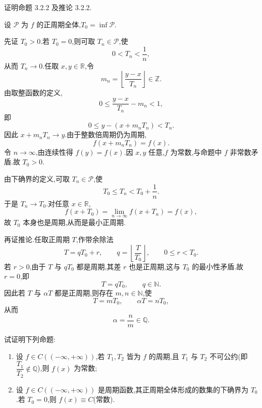\begin{example}
    证明命题 3.2.2 及推论 3.2.2.
\end{example}
\exampleblank

\begin{solution}
    设 $\mathcal P$ 为 $f$ 的正周期全体,$T_0=\inf\mathcal P$.

    先证 $T_0>0$.若 $T_0=0$,则可取 $T_n\in\mathcal P$,使
    \[
        0<T_n<\dfrac{1}{n},
    \]
    从而 $T_n\to0$.任取 $x,y\in\mathbb{R}$,令
    \[
        m_n=\left\lfloor\dfrac{y-x}{T_n}\right\rfloor\in\mathbb{Z}.
    \]
    由取整函数的定义,
    \[
        0\leq\dfrac{y-x}{T_n}-m_n<1,
    \]
    即
    \[
        0\leq y-(x+m_nT_n)<T_n.
    \]
    因此 $x+m_nT_n\to y$.由于整数倍周期仍为周期,
    \[
        f(x+m_nT_n)=f(x).
    \]
    令 $n\to\infty$,由连续性得 $f(y)=f(x)$.因 $x,y$ 任意,$f$ 为常数,与命题中 $f$ 非常数矛盾.故 $T_0>0$.

    由下确界的定义,可取 $T_n\in\mathcal P$,使
    \[
        T_0\leq T_n<T_0+\dfrac{1}{n}.
    \]
    于是 $T_n\to T_0$.对任意 $x\in\mathbb{R}$,
    \[
        f(x+T_0)=\lim\limits_{n\to\infty}f(x+T_n)=f(x),
    \]
    故 $T_0$ 本身也是周期,从而是最小正周期.

    再证推论.任取正周期 $T$,作带余除法
    \[
        T=qT_0+r,\qquad q=\left\lfloor\dfrac{T}{T_0}\right\rfloor,\qquad 0\leq r<T_0.
    \]
    若 $r>0$,由于 $T$ 与 $qT_0$ 都是周期,其差 $r$ 也是正周期,这与 $T_0$ 的最小性矛盾.故 $r=0$,即
    \[
        T=qT_0,\qquad q\in\mathbb{N}.
    \]
    因此若 $T$ 与 $\alpha T$ 都是正周期,则存在 $m,n\in\mathbb{N}$,使
    \[
        T=mT_0,\qquad \alpha T=nT_0,
    \]
    从而
    \[
        \alpha=\dfrac{n}{m}\in\mathbb{Q}.
    \]
\end{solution}

\begin{example}
    试证明下列命题:
    \begin{enumerate}
        \item 设 $f\in C((-\infty,+\infty))$,若 $T_1,T_2$ 皆为 $f$ 的周期,且 $T_1$ 与 $T_2$ 不可公约(即 $\dfrac{T_1}{T_2}\notin\mathbb{Q}$),则 $f(x)$ 为常数;
        \item 设 $f\in C((-\infty,+\infty))$ 是周期函数,其正周期全体形成的数集的下确界为 $T_0$.若 $T_0=0$,则 $f(x)\equiv C$(常数).
    \end{enumerate}
\end{example}
\exampleblank

